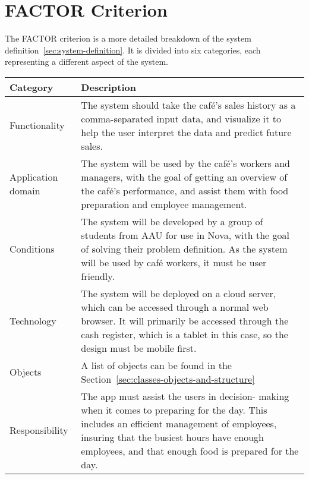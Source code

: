 \section{FACTOR Criterion}\label{sec:factor-criterion}

The FACTOR criterion is a more detailed breakdown of the system definition~\ref{sec:system-definition}.
It is divided into six categories, each representing a different aspect of the system.

\begin{tabular}{ m{2.5cm} m{10cm} }
    \toprule
    \textbf{Category} & \textbf{Description} \\
    \midrule
    Functionality & The system should take the café's sales history as a comma-separated input data, and visualize it to
    help the user interpret the data and predict future sales. \\
    \midrule
    Application domain & The system will be used by the café's workers and managers, with the goal of getting an
    overview of the café's performance, and assist them with food preparation and employee management. \\
    \midrule
    Conditions & The system will be developed by a group of students from AAU for use in Nova, with the goal of solving
    their problem definition.
    As the system will be used by café workers, it must be user friendly. \\
    \midrule
    Technology & The system will be deployed on a cloud server, which can be accessed through a normal web browser.
    It will primarily be accessed through the cash register, which is a tablet in this case, so the design must be
    mobile first. \\
    \midrule
    Objects & A list of objects can be found in the Section~\ref{sec:classes-objects-and-structure} \\
    \midrule
    Responsibility & The app must assist the users in decision- making when it comes to preparing for the day.
    This includes an efficient management of employees, insuring that the busiest hours have enough employees, and
    that enough food is prepared for the day. \\
    \bottomrule
\end{tabular}
